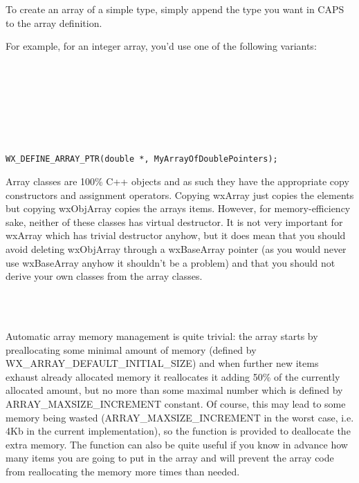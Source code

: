 To create an array of a simple type, simply append the type you want in CAPS to
the array definition.

For example, for an integer array, you'd use one of the following variants:

\\
\\
\\
\\
\\
\\

\begin{verbatim} 
WX_DEFINE_ARRAY_PTR(double *, MyArrayOfDoublePointers);
\end{verbatim}

\label{arrayconstructorsdestructors}

Array classes are 100\% C++ objects and as such they have the appropriate copy
constructors and assignment operators. Copying wxArray just copies the elements
but copying wxObjArray copies the arrays items. However, for memory-efficiency
sake, neither of these classes has virtual destructor. It is not very important
for wxArray which has trivial destructor anyhow, but it does mean that you
should avoid deleting wxObjArray through a wxBaseArray pointer (as you would
never use wxBaseArray anyhow it shouldn't be a problem) and that you should not
derive your own classes from the array classes.

\\
\\

\label{wxarraymemorymanagement}

Automatic array memory management is quite trivial: the array starts by
preallocating some minimal amount of memory (defined by
WX\_ARRAY\_DEFAULT\_INITIAL\_SIZE) and when further new items exhaust already
allocated memory it reallocates it adding 50\% of the currently allocated
amount, but no more than some maximal number which is defined by
ARRAY\_MAXSIZE\_INCREMENT constant. Of course, this may lead to some memory
being wasted (ARRAY\_MAXSIZE\_INCREMENT in the worst case, i.e. 4Kb in the
current implementation), so the  function is
provided to deallocate the extra memory. The  
function can also be quite useful if you know in advance how many items you are
going to put in the array and will prevent the array code from reallocating the
memory more times than needed.

